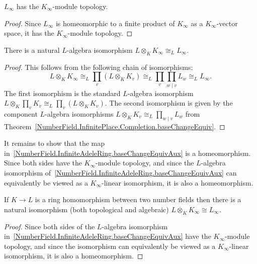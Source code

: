 \begin{theorem}
  \label{NumberField.InfiniteAdeleRing.instIsModuleTopology_fLT}
  \leanok
  $L_{\infty}$ has the $K_{\infty}$-module topology.
\end{theorem}
\begin{proof}
  Since $L_{\infty}$ is homeomorphic to a finite product of $K_{\infty}$ as a $K_{\infty}$-vector
  space, it has the $K_{\infty}$-module topology.
\end{proof}

\begin{theorem}
  \label{NumberField.InfiniteAdeleRing.baseChangeEquivAux}
  \leanok
  There is a natural $L$-algebra isomorphism
  $L \otimes_K K_{\infty} \cong_L L_{\infty}$.
\end{theorem}
\begin{proof}
  This follows from the following chain of isomorphisms:
  \[
    L \otimes_K K_{\infty} \cong_L \prod_v (L \otimes_K K_v) \cong_L
      \prod_v \prod_{w\mid v}L_w \cong_L L_{\infty} .
  \]
  The first isomorphism is the standard $L$-algebra isomorphism
  $L \otimes_K \prod_v K_v \cong_L \prod_v (L \otimes_K K_v)$.
  The second isomorphism is given by the component $L$-algebra isomorphisms
  $L \otimes_K K_v \cong_L \prod_{w\mid v}L_w$ from
  Theorem~\ref{NumberField.InfinitePlace.Completion.baseChangeEquiv}.
\end{proof}

It remains to show that the map in~\ref{NumberField.InfiniteAdeleRing.baseChangeEquivAux} is a
homeomorphism.
Since both sides have the $K_{\infty}$-module topology, and since the $L$-algebra isomorphism
of~\ref{NumberField.InfiniteAdeleRing.baseChangeEquivAux} can equivalently be viewed as a
$K_{\infty}$-linear isomorphism, it is also a homeomorphism.

\begin{theorem}
  \label{NumberField.InfiniteAdeleRing.baseChangeEquiv}
  \leanok
  If $K\to L$ is a ring homomorphism between two number fields then there is a natural isomorphism
  (both topological and algebraic) $L\otimes_KK_\infty\cong L_\infty$.
\end{theorem}
\begin{proof}
  Since both sides of the $L$-algebra isomorphism
  in~\ref{NumberField.InfiniteAdeleRing.baseChangeEquivAux} have the $K_{\infty}$-module topology,
  and since the isomorphism can equivalently be viewed as a $K_{\infty}$-linear isomorphism,
  it is also a homeomorphism.
\end{proof}


